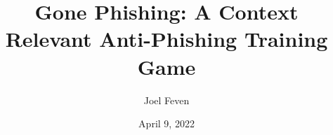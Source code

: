 \documentclass{l4proj}
\begin{document}
\title{Gone Phishing: A Context Relevant Anti-Phishing Training Game }
\author{Joel Feven}
\date{April 9, 2022}

\maketitle

\begin{abstract}

\end{abstract}


%
%
%
\educationalconsent


\tableofcontents

%
%
%
%
%
%
%
\end{document}
